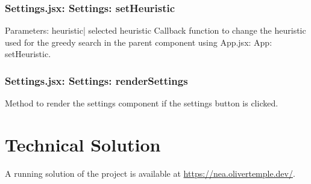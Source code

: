 \documentclass[titlepage]{article}
\begin{document}
\subsubsection{Settings.jsx: Settings: setHeuristic}
Parameters:\newline
\indent heuristic| selected heuristic\newline
Callback function to change the heuristic used for the greedy search in the parent component using App.jsx: App: setHeuristic.

\subsubsection{Settings.jsx: Settings: renderSettings}
Method to render the settings component if the settings button is clicked.

\newpage
\section{Technical Solution}
A running solution of the project is available at \url{https://nea.olivertemple.dev/}.
\end{document}
